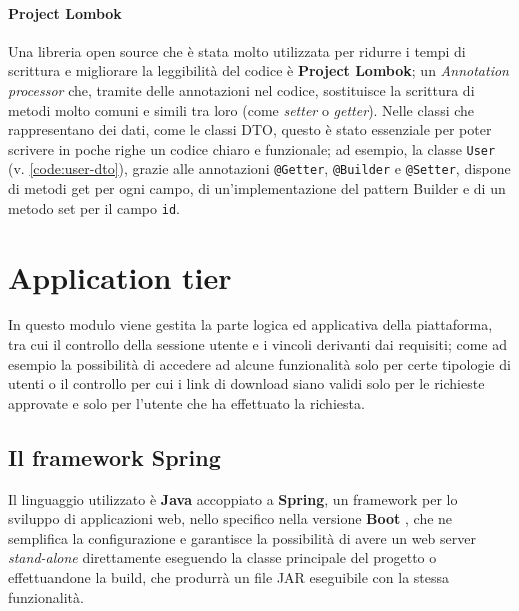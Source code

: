\paragraph{Project Lombok}
Una libreria open source che è stata molto utilizzata per ridurre i tempi di
scrittura e migliorare la leggibilità del codice è \textbf{Project Lombok};
un \textit{Annotation processor} che, tramite delle annotazioni nel codice,
sostituisce la scrittura di metodi molto comuni e simili tra loro (come
\textit{setter} o \textit{getter}).
Nelle classi che rappresentano dei dati, come le classi DTO, questo è stato
essenziale per poter scrivere in poche righe un codice chiaro e funzionale;
ad esempio, la classe \texttt{User} (v. \ref{code:user-dto}), grazie alle annotazioni
\texttt{@Getter}, \texttt{@Builder} e \texttt{@Setter}, dispone di metodi get
per ogni campo, di un'implementazione del pattern Builder e di un metodo set per
il campo \texttt{id}.





\section{Application tier}
In questo modulo viene gestita la parte logica ed applicativa della piattaforma,
tra cui il controllo della sessione utente e i vincoli derivanti dai requisiti;
come ad esempio la possibilità di accedere ad alcune funzionalità solo per certe
tipologie di utenti o il controllo per cui i link di download siano validi solo
per le richieste approvate e solo per l'utente che ha effettuato la richiesta. 


\subsection{Il framework Spring}
Il linguaggio utilizzato è \textbf{Java} accoppiato a \textbf{Spring},
un framework per lo sviluppo di applicazioni web, nello specifico nella versione
\textbf{Boot} \cite{spring:boot}, che ne semplifica la configurazione e garantisce
la possibilità di avere un web server \textit{stand-alone} direttamente eseguendo
la classe principale del progetto o effettuandone la build, che produrrà un file
JAR eseguibile con la stessa funzionalità.

